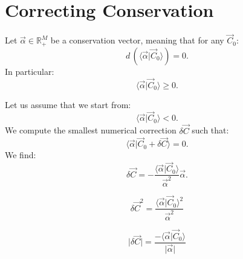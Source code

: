 \documentclass[aps,12pt]{revtex4}
\begin{document}
\section{Correcting Conservation}

Let $\vec{\alpha}\in\mathbb{R}_+^M$ be a conservation vector, meaning that for any $\vec{C}_0$:
\begin{equation}
d\,\left(\langle \vec{\alpha} \vert \vec{C}_0 \rangle\right) = 0.
\end{equation}
In particular:
\begin{equation}
	\langle \vec{\alpha} \vert \vec{C}_0 \rangle \geq 0.
\end{equation}

Let us assume that we start from:
\begin{equation}
	\langle \vec{\alpha} \vert \vec{C}_0 \rangle < 0.
\end{equation}
We compute the smallest numerical correction $\delta\vec{C}$ such that:
\begin{equation}
	\langle \vec{\alpha} \vert \vec{C}_0 + \delta\vec{C} \rangle = 0.
\end{equation}
We find:
\begin{equation}
	\delta\vec{C} =
	 -\dfrac{\langle \vec{\alpha} \vert \vec{C}_0 \rangle}{\vec{\alpha}^2}
	  \vec{\alpha}.
\end{equation}

\begin{equation}
	\delta\vec{C}^2 = \dfrac{\langle \vec{\alpha} \vert \vec{C}_0 \rangle^2}{\vec{\alpha}^2}
\end{equation}
	
\begin{equation}
	\vert\delta\vec{C}\vert = \dfrac{-\langle \vec{\alpha} \vert \vec{C}_0 \rangle}{\vert \vec{\alpha} \vert}
\end{equation}	
\end{document}
